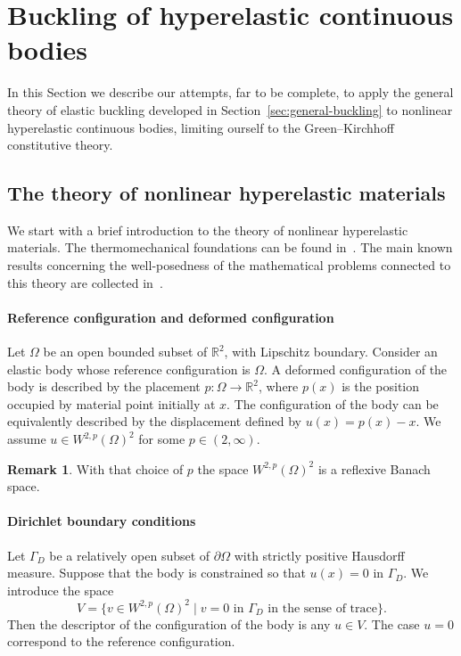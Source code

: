 \documentclass[a4paper,11pt]{article}
\theoremstyle{definition}
\newtheorem{rmk}[prop]{Remark}
\begin{document}
\section{Buckling of hyperelastic continuous bodies}
\label{sec:body}

In this Section we describe our attempts, far to be complete, to apply the general theory of elastic buckling developed in Section~\ref{sec:general-buckling} to nonlinear hyperelastic continuous bodies, limiting ourself to the Green--Kirchhoff constitutive theory.

\subsection{The theory of nonlinear hyperelastic materials}

We start with a brief introduction to the theory of nonlinear hyperelastic materials. The thermomechanical foundations can be found in~\cite{gurtin-anand-fried}. The main known results concerning the well-posedness of the mathematical problems connected to this theory are collected in~\cite{ciarlet}.

\paragraph{Reference configuration and deformed configuration} Let $\Omega$ be an open bounded subset of $\mathbb{R}^2$, with Lipschitz boundary. Consider an elastic body whose reference configuration is $\Omega$. A deformed configuration of the body is described by the placement $p\colon\Omega\to\mathbb{R}^2$, where $p(x)$ is the position occupied by material point initially at $x$. The configuration of the body can be equivalently described by the displacement defined by $u(x)=p(x)-x$. We assume $u\in W^{2,p}(\Omega)^2$ for some $p\in(2,\infty)$.

\begin{rmk}
With that choice of $p$ the space $W^{2,p}(\Omega)^2$ is a reflexive Banach space.
\end{rmk}

\paragraph{Dirichlet boundary conditions} Let $\Gamma_D$ be a relatively open subset of $\partial\Omega$ with strictly positive Hausdorff measure. Suppose that the body is constrained so that $u(x)=0$ in $\Gamma_D$. We introduce the space
\[
V=\{v\in W^{2,p}(\Omega)^2\;|\;\text{$v=0$ in $\Gamma_D$ in the sense of trace}\}.
\]
Then the descriptor of the configuration of the body is any $u\in V$. The case $u=0$ correspond to the reference configuration.
\end{document}
